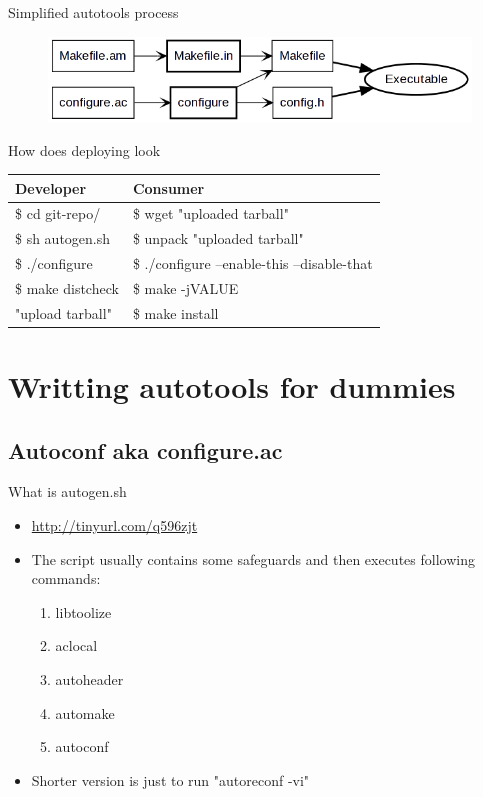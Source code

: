 \documentclass{beamer}
\begin{document}
\begin{frame}{Simplified autotools process}
    \begin{figure}
    \includegraphics[width= 1.0\linewidth]{autotools_simple.png}
    \end{figure}
\end{frame}

\begin{frame}{How does deploying look}
    \begin{tabular}{|l|l|}
    \toprule
    Developer & Consumer \\
    \midrule
    \$ cd git-repo/ & \$ wget "uploaded tarball" \\
    \$ sh autogen.sh & \$ unpack "uploaded tarball" \\
    \$ ./configure & \$ ./configure --enable-this --disable-that \\
    \$ make distcheck & \$ make -jVALUE \\
    "upload tarball" & \$ make install \\
    \bottomrule
    \end{tabular}
\end{frame}

\section{Writting autotools for dummies}

\subsection{Autoconf aka configure.ac}

\begin{frame}[t]{What is autogen.sh}
    \begin{itemize}
    \item \url{http://tinyurl.com/q596zjt}
    \item The script usually contains some safeguards and then executes following commands:
    \begin{enumerate}
    \item libtoolize
    \item aclocal
    \item autoheader
    \item automake
    \item autoconf
    \end{enumerate}
    \item Shorter version is just to run "autoreconf -vi"
    \end{itemize}
\end{frame}
\end{document}
